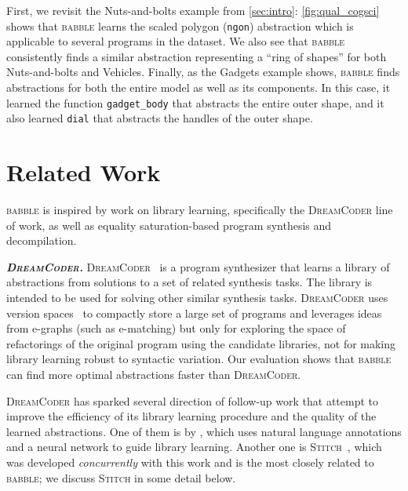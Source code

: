 \documentclass[acmsmall,screen,nonacm,review=false,timestamp=false]{acmart}
\newcommand{\emphbf}[1]{\emph{\textbf{#1}\xspace}}
\newcommand{\mypara}[1]{\smallskip\noindent\emphbf{#1.}\xspace}
\newcommand{\egraphs}{e-graphs\xspace}
\newcommand{\tname}[1]{\textsc{#1}\xspace}
\newcommand{\tool}{\tname{babble}}
\newcommand{\dc}{\tname{DreamCoder}}
\newcommand{\stitch}{\tname{Stitch}}
\newcommand{\nuts}{Nuts-and-bolts\xspace}
\begin{document}
First, we revisit the \nuts example
  from \autoref{sec:intro}:
  \autoref{fig:qual_cogsci} shows that \tool learns the scaled polygon (\texttt{ngon}) abstraction which
  is applicable to several programs in the dataset.
We also see that \tool consistently
  finds a similar abstraction
  representing a ``ring of shapes'' for both
  \nuts and Vehicles.
Finally, as the Gadgets example shows,
  \tool finds abstractions for both
  the entire model as well as its components.
In this case,
  it learned the function \texttt{gadget\_body}
  that abstracts the entire outer shape,
  and it also learned \texttt{dial} that abstracts
  the handles of the outer shape.
 \section{Related Work}
\label{sec:related}

\tool is inspired by work on library learning,
specifically the \dc line of work,
as well as equality saturation-based program synthesis and decompilation.

\mypara{\dc}
\dc~\cite{dreamcoder} is a program synthesizer
  that learns a library of abstractions
  from solutions to a set of related synthesis tasks.
The library is intended to be used for solving other
  similar synthesis tasks.
\dc
  uses version spaces~\cite{vsa1, vsa2}
  to compactly store a large
  set of programs
  and leverages ideas from \egraphs
  (such as e-matching)
  but only for exploring the space of refactorings
  of the original program using the candidate libraries,
  not for making library learning robust to syntactic variation.
Our evaluation shows that \tool can find more optimal abstractions faster than \dc.

\dc has sparked several direction of follow-up work
that attempt to improve the efficiency of its library learning procedure
and the quality of the learned abstractions.
One of them is by \citet{laps},
which uses natural language annotations and a neural network
to guide library learning.
Another one is \stitch~\cite{stitch},
which was developed \emph{concurrently} with this work
and is the most closely related to \tool;
we discuss \stitch in some detail below.
\end{document}
